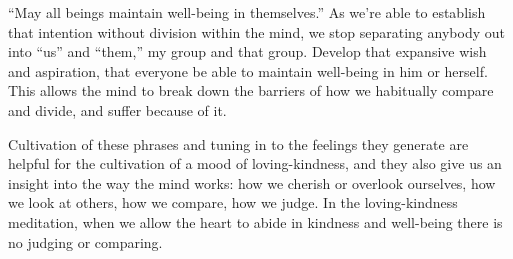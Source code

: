 “May all beings maintain well-being in themselves.” As we’re able to
establish that intention without division within the mind, we stop
separating anybody out into “us” and “them,” my group and that group.
Develop that expansive wish and aspiration, that everyone be able to
maintain well-being in him or herself. This allows the mind to break
down the barriers of how we habitually compare and divide, and suffer
because of it.

Cultivation of these phrases and tuning in to the feelings they generate
are helpful for the cultivation of a mood of loving-kindness, and they
also give us an insight into the way the mind works: how we cherish or
overlook ourselves, how we look at others, how we compare, how we judge.
In the loving-kindness meditation, when we allow the heart to abide in
kindness and well-being there is no judging or comparing.
